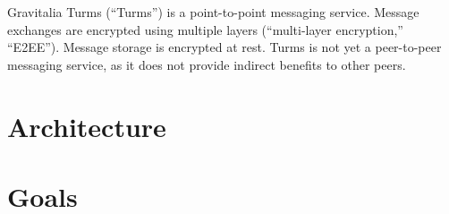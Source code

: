 Gravitalia Turms (\enquote{Turms}) is a point-to-point messaging service. 
Message exchanges are encrypted using multiple layers (\enquote{multi-layer 
encryption,} \enquote{E2EE}). Message storage is encrypted at rest. Turms is 
not yet a peer-to-peer messaging service, as it does not provide indirect 
benefits to other peers\cite{rfc5694}.

\begin{center}
\end{center}

\section{Architecture}
\label{sec:architecture}



\section{Goals}
\label{sec:goals}

